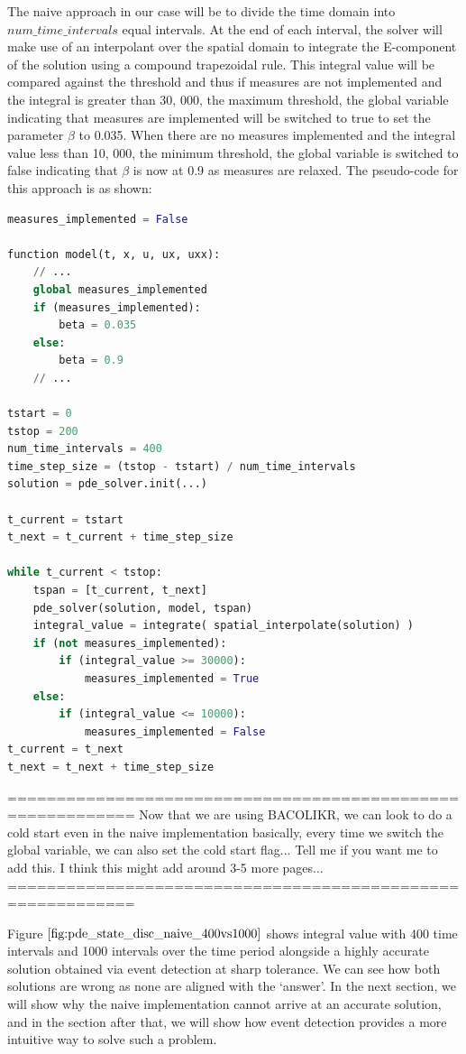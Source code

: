 \documentclass{article}
\begin{document}
The naive approach in our case will be to divide the time domain into $num\_time\_intervals$ equal intervals. At the end of each interval, the solver will make use of an interpolant over the spatial domain to integrate the E-component of the solution using a compound trapezoidal rule. This integral value will be compared against the threshold and thus if measures are not implemented and the integral is greater than 30, 000, the maximum threshold, the global variable indicating that measures are implemented will be switched to true to set the parameter $\beta$ to 0.035. When there are no measures implemented and the integral value less than 10, 000, the minimum threshold, the global variable is switched to false indicating that $\beta$ is now at 0.9 as measures are relaxed. The pseudo-code for this approach is as shown:

\begin{minipage}{\linewidth}
\begin{lstlisting}[language=Python]
measures_implemented = False

function model(t, x, u, ux, uxx):
	// ...
	global measures_implemented
	if (measures_implemented):
		beta = 0.035
	else:
		beta = 0.9
	// ...

tstart = 0
tstop = 200
num_time_intervals = 400
time_step_size = (tstop - tstart) / num_time_intervals
solution = pde_solver.init(...)

t_current = tstart
t_next = t_current + time_step_size

while t_current < tstop:
	tspan = [t_current, t_next]
	pde_solver(solution, model, tspan)
	integral_value = integrate( spatial_interpolate(solution) )
	if (not measures_implemented):
		if (integral_value >= 30000): 
			measures_implemented = True
	else:
		if (integral_value <= 10000):
			measures_implemented = False
t_current = t_next
t_next = t_next + time_step_size
\end{lstlisting}
\end{minipage} 

===========================================================
Now that we are using BACOLIKR, we can look to do a cold start even in the naive implementation
basically, every time we switch the global variable, we can also set the cold start flag...
Tell me if you want me to add this. I think this might add around 3-5 more pages... 
===========================================================

Figure $\ref{fig:pde_state_disc_naive_400vs1000}$ shows integral value with 400 time intervals and 1000 intervals over the time period alongside a highly accurate solution obtained via event detection at sharp tolerance. We can see how both solutions are wrong as none are aligned with the `answer'. In the next section, we will show why the naive implementation cannot arrive at an accurate solution, and in the section after that, we will show how event detection provides a more intuitive way to solve such a problem.
\end{document}
